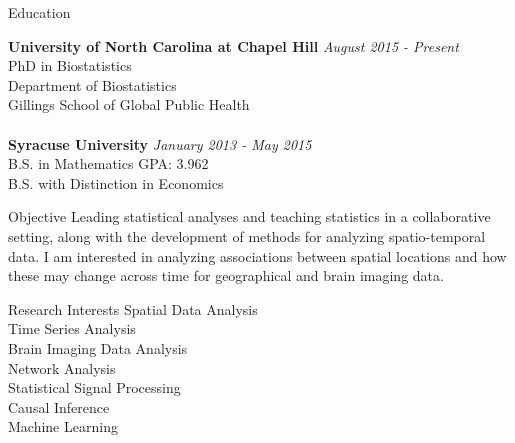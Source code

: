 \documentclass{resume} %
\begin{document}

\begin{rSection}{Education}

{\bf University of North Carolina at Chapel Hill} \hfill {\em August 2015 - Present} 
\\ PhD in Biostatistics
\\ Department of Biostatistics
\\ Gillings School of Global Public Health\\
\\{\bf Syracuse University} \hfill {\em January 2013 - May 2015} 
\\ B.S. in Mathematics\hfill { GPA: 3.962}
\\ B.S. with Distinction in Economics

\end{rSection}


\begin{rSection}{Objective}
Leading statistical analyses and teaching statistics in a collaborative setting, along with the development of methods for analyzing spatio-temporal data.  I am interested in analyzing associations between spatial locations and how these may change across time for geographical and brain imaging data.
\end{rSection}


\begin{rSection}{Research Interests}
Spatial Data Analysis\\
Time Series Analysis\\
Brain Imaging Data Analysis\\
Network Analysis\\
Statistical Signal Processing\\
Causal Inference\\
Machine Learning
\end{rSection}
\end{document}
